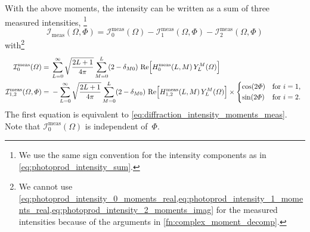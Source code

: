 With the above moments, the intensity can be written as a sum of three
measured intensities, \ie\footnote{We use the same sign convention for
the intensity components as in \cref{eq:photoprod_intensity_sum}.}
\begin{equation}
  \mathcal{I}_\text{meas}(\Omega, \Phi)
  = \mathcal{I}_0^\text{meas}(\Omega) - \mathcal{I}_1^\text{meas}(\Omega, \Phi) - \mathcal{I}_2^\text{meas}(\Omega, \Phi)
\end{equation}
with\footnote{We cannot use
\cref{eq:photoprod_intensity_0_moments_real,eq:photoprod_intensity_1_moments_real,eq:photoprod_intensity_2_moments_imag}
for the measured intensities because of the arguments in
\cref{fn:complex_moment_decomp}.}
\begin{align}
  \mathcal{I}_0^\text{meas}(\Omega)
  ={}& \sum_{L = 0}^\infty \sqrt{\frac{2 L + 1}{4 \pi}} \sum_{M = 0}^{L} (2 - \delta_{M 0})\,
  \Re{H_0^\text{meas}(L, M)\, Y_L^M(\Omega)}
  \\
  \mathcal{I}_{1, 2}^\text{meas}(\Omega, \Phi)
  ={}& -\sum_{L = 0}^\infty \sqrt{\frac{2 L + 1}{4 \pi}} \sum_{M = 0}^{L} (2 - \delta_{M 0})\,
  \Re{H_{1, 2}^\text{meas}(L, M)\, Y_L^M(\Omega)} \times \begin{cases*}
    \cos(2 \Phi) & for $i = 1$, \\
    \sin(2 \Phi) & for $i = 2$.
  \end{cases*}
\end{align}
The first equation is equivalent to
\cref{eq:diffraction_intensity_moments_meas}.  Note that
$\mathcal{I}_0^\text{meas}(\Omega)$ is independent of~$\Phi$.

